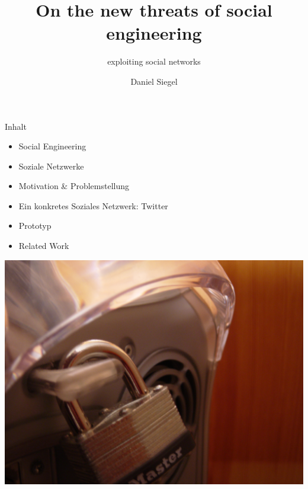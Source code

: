 \documentclass[11pt]{beamer}
\author{Daniel Siegel}
\title{On the new threats of social engineering}%
\subtitle{exploiting social networks}
\institute{27. Mai 2009}
\date{}
\begin{document}
\begin{frame}[t,plain]
\titlepage
\end{frame}

\begin{frame}[t]{Inhalt}
  \begin{itemize}
    \item Social Engineering
    \item Soziale Netzwerke
    \item Motivation \& Problemstellung
    \item Ein konkretes Soziales Netzwerk: Twitter
    \item Prototyp
    \item Related Work
  \end{itemize}
\end{frame}


\begin{frame}[t]
\vspace{-1em}
  \begin{center}
    \includegraphics[height=0.95\textheight]{security}
  \end{center}
\end{frame}
\end{document}
